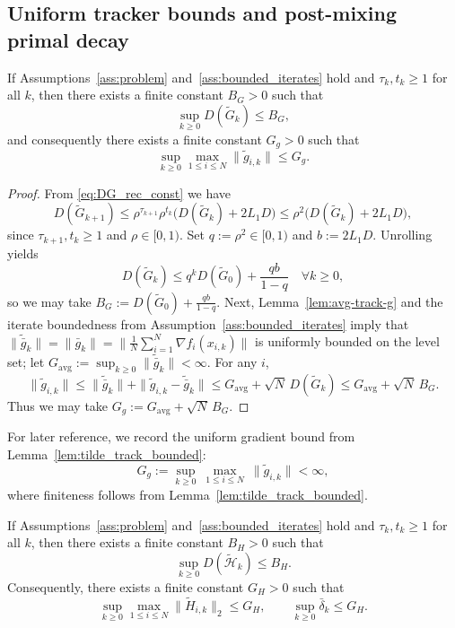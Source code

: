 \documentclass[review,onefignum,onetabnum]{siamart171218}
\begin{document}
	\subsection{Uniform tracker bounds and post-mixing primal decay}
	
	\begin{lemma}\label{lem:tilde_track_bounded}
		If Assumptions~\ref{ass:problem} and~\ref{ass:bounded_iterates}
		hold and $\tau_k,t_k\ge 1$ for all $k$,
		then there exists a finite constant $B_G>0$ such that
		\[
		\sup_{k\ge 0} D(\tilde G_k)\le B_G,
		\]
		and consequently there exists a finite constant $G_g>0$ such that
		\[
		\sup_{k\ge 0}\max_{1\le i\le N}\|\tilde g_{i,k}\|\le G_g.
		\]
	\end{lemma}
	\begin{proof}
		From \eqref{eq:DG_rec_const} we have
		\[
		D(\tilde G_{k+1})\le \rho^{\tau_{k+1}}\rho^{t_k}\big(D(\tilde G_k)+2L_1D\big)\le \rho^2\big(D(\tilde G_k)+2L_1D\big),
		\]
		since $\tau_{k+1},t_k\ge 1$ and $\rho\in[0,1)$.
		Set $q:=\rho^2\in[0,1)$ and $b:=2L_1D$. Unrolling yields
		\[
		D(\tilde G_k)\le q^k D(\tilde G_0)+\frac{qb}{1-q}\quad\forall k\ge 0,
		\]
		so we may take $B_G:=D(\tilde G_0)+\frac{qb}{1-q}$.
		Next, Lemma~\ref{lem:avg-track-g} and the iterate boundedness from Assumption~\ref{ass:bounded_iterates} imply that
		$\|\tilde{\bar g}_k\|=\|\bar g_k\|=\big\|\frac1N\sum_{i=1}^N \nabla f_i(x_{i,k})\big\|$ is uniformly bounded on the level set;
		let $G_{\mathrm{avg}}:=\sup_{k\ge 0}\|\tilde{\bar g}_k\|<\infty$.
		For any $i$,
		\[
		\|\tilde g_{i,k}\|\le \|\tilde{\bar g}_k\|+\|\tilde g_{i,k}-\tilde{\bar g}_k\|
		\le G_{\mathrm{avg}}+\sqrt N\,D(\tilde G_k)\le G_{\mathrm{avg}}+\sqrt N\,B_G.
		\]
		Thus we may take $G_g:=G_{\mathrm{avg}}+\sqrt N\,B_G$.
	\end{proof}
	
	For later reference, we record the uniform gradient bound from Lemma~\ref{lem:tilde_track_bounded}:
	\begin{equation}\label{eq:step_unif_app}
		G_g:=\sup_{k\ge 0}\ \max_{1\le i\le N}\ \|\tilde g_{i,k}\| < \infty,
	\end{equation}
	where finiteness follows from Lemma~\ref{lem:tilde_track_bounded}.
	
	\begin{lemma}\label{lem:tilde_hess_bounded}
		If Assumptions~\ref{ass:problem} and~\ref{ass:bounded_iterates}
		hold and $\tau_k,t_k\ge 1$ for all $k$,
		then there exists a finite constant $B_H>0$ such that
		\[
		\sup_{k\ge 0} D(\tilde{\mathcal H}_k)\le B_H.
		\]
		Consequently, there exists a finite constant $G_H>0$ such that
		\[
		\sup_{k\ge 0}\max_{1\le i\le N}\big\|\tilde H_{i,k}\big\|_2 \le G_H,
		\qquad
		\sup_{k\ge 0}\bar\delta_k \le G_H.
		\]
	\end{lemma}
	
\end{document}
